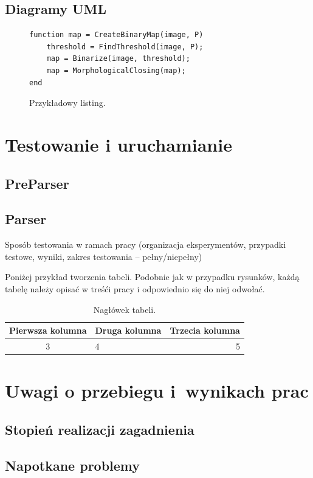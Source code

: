 \documentclass[a4paper]{book}
\begin{document}
\section{Diagramy UML}

\begin{figure}
	\begin{lstlisting}[frame=single]
function map = CreateBinaryMap(image, P)
	threshold = FindThreshold(image, P);
	map = Binarize(image, threshold);
	map = MorphologicalClosing(map);
end
	\end{lstlisting}
	\caption{Przykładowy listing.}
	\label{lst:przyklad}
\end{figure}

\chapter{Testowanie i uruchamianie}
\section {PreParser}
\section {Parser}
Sposób testowania w ramach pracy (organizacja eksperymentów, przypadki testowe, wyniki, zakres testowania -- pełny/niepełny)

Poniżej przykład tworzenia tabeli. Podobnie jak w przypadku rysunków, każdą tabelę należy opisać w treśći pracy i odpowiednio się do niej odwołać.

\begin{table}
	\centering
	\caption{Nagłówek tabeli.}
	\begin{tabular}{|c|l|r|}
		\hline
		Pierwsza kolumna & Druga kolumna & Trzecia kolumna \\
		\hline
		3 & 4 & 5 \\
		\hline 
	\end{tabular}
	\label{tab:przyklad_tabeli}
\end{table}

\chapter{Uwagi o przebiegu i~wynikach prac}
\section {Stopień realizacji zagadnienia}
\section{Napotkane problemy}
\end{document}
